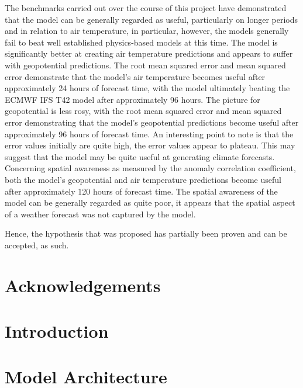 \documentclass[hidelinks, 12pt]{style}
\begin{document}
The benchmarks carried out over the course of this project have demonstrated that the model can be generally regarded as useful, particularly on longer periods and in relation to air temperature, in particular, however, the models generally fail to beat well established physics-based models at this time. The model is significantly better at creating air temperature predictions and appears to suffer with geopotential predictions. The root mean squared error and mean squared error demonstrate that the model's air temperature becomes useful after approximately 24 hours of forecast time, with the model ultimately beating the ECMWF IFS T42 model after approximately 96 hours. The picture for geopotential is less rosy, with the root mean squared error and mean squared error demonstrating that the model's geopotential predictions become useful after approximately 96 hours of forecast time. An interesting point to note is that the error values initially are quite high, the error values appear to plateau. This may suggest that the model may be quite useful at generating climate forecasts. Concerning spatial awareness as measured by the anomaly correlation coefficient, both the model's geopotential and air temperature predictions become useful after approximately 120 hours of forecast time. The spatial awareness of the model can be generally regarded as quite poor, it appears that the spatial aspect of a weather forecast was not captured by the model. 

Hence, the hypothesis that was proposed has partially been proven and can be accepted, as such.

\chapter*{Acknowledgements}


\tableofcontents

\listoffigures

\chapter{Introduction}


\chapter{Model Architecture}\label{architecture_chapter}

\end{document}
